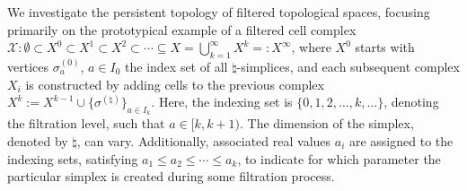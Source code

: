 We investigate the persistent topology of filtered topological spaces, focusing primarily on the prototypical example of a filtered cell complex $\mathcal{X}: \emptyset \subset X^{0} \subset X^{1} \subset X^{2} \subset \cdots \subseteq X = \bigcup_{k=1}^{\infty} X^{k} =: X^\infty$, where \(X^{0}\) starts with vertices \(\sigma^{(0)}_a\), $a \in I_0$ the index set of all $\natural$-simplices, and each subsequent complex \(X_{i}\) is constructed by adding cells to the previous complex $X^{k} := X^{k-1} \cup \{\sigma^{(\natural)}\}_{a \in I_{k}}$. Here, the indexing set is \(\{0, 1, 2, \ldots, k, \ldots\}\), denoting the filtration level, such that $a \in [k,k+1)$. The dimension of the simplex, denoted by $\natural$, can vary. Additionally, associated real values \(a_{i}\) are assigned to the indexing sets, satisfying \(a_{1} \leq a_{2} \leq \cdots \leq a_{k}\), to indicate for which parameter the particular simplex is created during some filtration process.

